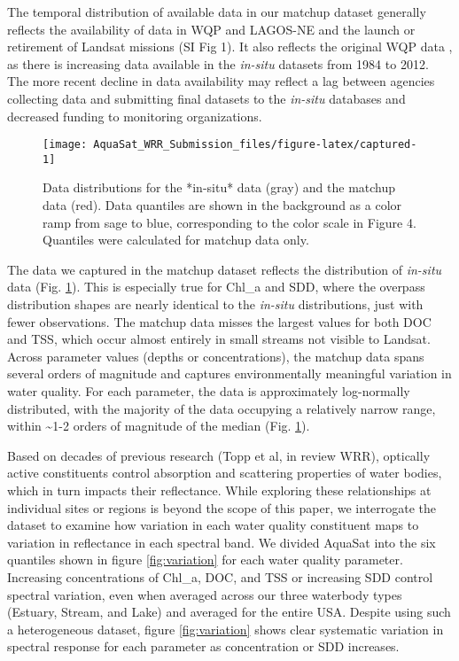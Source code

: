\documentclass[]{agujournal2018}
\begin{document}
The temporal distribution of available data in our matchup dataset
generally reflects the availability of data in WQP and LAGOS-NE and the
launch or retirement of Landsat missions (SI Fig 1). It also reflects
the original WQP data \citep{Read2017}, as there is increasing data
available in the \emph{in-situ} datasets from 1984 to 2012. The more
recent decline in data availability may reflect a lag between agencies
collecting data and submitting final datasets to the \emph{in-situ}
databases and decreased funding \citep{Myers2017} to monitoring
organizations.

\begin{figure}[h]
\texttt{[image: AquaSat\_WRR\_Submission\_files/figure-latex/captured-1]} \caption{Data distributions for the *in-situ* data (gray) and the matchup data (red). Data quantiles are shown in the background as a color ramp from sage to blue, corresponding to the color scale in Figure 4. Quantiles were calculated for matchup data only.}\label{fig:captured}
\end{figure}

The data we captured in the matchup dataset reflects the distribution of
\emph{in-situ} data (Fig. \ref{fig:captured}). This is especially true
for Chl\_a and SDD, where the overpass distribution shapes are nearly
identical to the \emph{in-situ} distributions, just with fewer
observations. The matchup data misses the largest values for both DOC
and TSS, which occur almost entirely in small streams not visible to
Landsat. Across parameter values (depths or concentrations), the matchup
data spans several orders of magnitude and captures environmentally
meaningful variation in water quality. For each parameter, the data is
approximately log-normally distributed, with the majority of the data
occupying a relatively narrow range, within \textasciitilde{}1-2 orders
of magnitude of the median (Fig. \ref{fig:captured}).

Based on decades of previous research (Topp et al, in review WRR),
optically active constituents control absorption and scattering
properties of water bodies, which in turn impacts their reflectance.
While exploring these relationships at individual sites or regions is
beyond the scope of this paper, we interrogate the dataset to examine
how variation in each water quality constituent maps to variation in
reflectance in each spectral band. We divided AquaSat into the six
quantiles shown in figure \ref{fig:variation} for each water quality
parameter. Increasing concentrations of Chl\_a, DOC, and TSS or
increasing SDD control spectral variation, even when averaged across our
three waterbody types (Estuary, Stream, and Lake) and averaged for the
entire USA. Despite using such a heterogeneous dataset, figure
\ref{fig:variation} shows clear systematic variation in spectral
response for each parameter as concentration or SDD increases.
\end{document}
